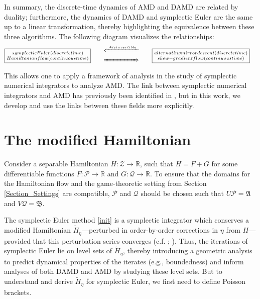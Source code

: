 \documentclass[11pt]{article}
\renewcommand{\P}{\mathcal{P}}
\newcommand{\R}{\mathbb{R}}
\newcommand{\Z}{\mathcal{Z}}
\newcommand{\Q}{\mathcal{Q}}
\begin{document}
In summary, the discrete-time dynamics of AMD and DAMD are related by duality; furthermore, the dynamics of DAMD and symplectic Euler are the same up to a linear transformation, thereby highlighting the equivalence between these three algorithms. The following diagram visualizes the relationships:
\begin{align*}
    \fbox{$\substack{\textrm{symplectic Euler (discrete time)}\\\textrm{Hamiltonian flow (continuous time)}}$}\qquad &\substack{\xLeftarrow{A\textrm{ is invertible}} \\ \xRightarrow{\hphantom{A\textrm{ is invertible}}}}\qquad\fbox{$\substack{\textrm{alternating mirror descent (discrete time)}\\\textrm{skew-gradient flow (continuous time)}}$} 
\end{align*}
This allows one to apply a framework of analysis in the study of symplectic numerical integrators to analyze AMD. The link between symplectic numerical integrators and AMD has previously been identified in \citep{Wibisono2022}, but in this work, we develop and use the links between these fields more explicitly.

\section{The modified Hamiltonian}\label{MH_more}

Consider a separable Hamiltonian $H \colon \Z \to \R$, such that $H=F+G$ for some differentiable functions $F \colon \P \to \R$ and $G \colon \Q \to \R$. To ensure that the domains for the Hamiltonian flow and the game-theoretic setting from Section \ref{Section_Settings} are compatible, $\P$ and $\Q$ should be chosen such that $U\P=\mathfrak{A}$ and $V\Q=\mathfrak{B}$.

The symplectic Euler method \eqref{init} is a symplectic integrator which conserves a modified Hamiltonian $\widetilde{H}_{\eta}$---perturbed in order-by-order corrections in $\eta$ from $H$---provided that this perturbation series converges (c.f. \citealp[Sections IX.3.1–IX.3.2]{Hairer2006}; \citealp{Yoshida1993}). Thus, the iterations of symplectic Euler lie on level sets of $\widetilde{H}_{\eta}$, thereby introducing a geometric analysis to predict dynamical properties of the iterates (e.g., boundedness) and inform analyses of both DAMD and AMD by studying these level sets. But to understand and derive $\widetilde{H}_{\eta}$ for symplectic Euler, we first need to define Poisson brackets.
\end{document}
